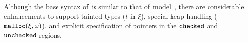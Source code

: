 Although the base syntax of~\lang is similar to that of~\checkedc model~\cite{li22checkedc}, there are considerable enhancements to support tainted types ($t$ in $\xi$), special heap handling (\ie $\mathtt{malloc}({\xi},{\omega})$), and explicit specification of pointers in the $\mathtt{checked}$ and $\mathtt{unchecked}$ regions.

%
%
